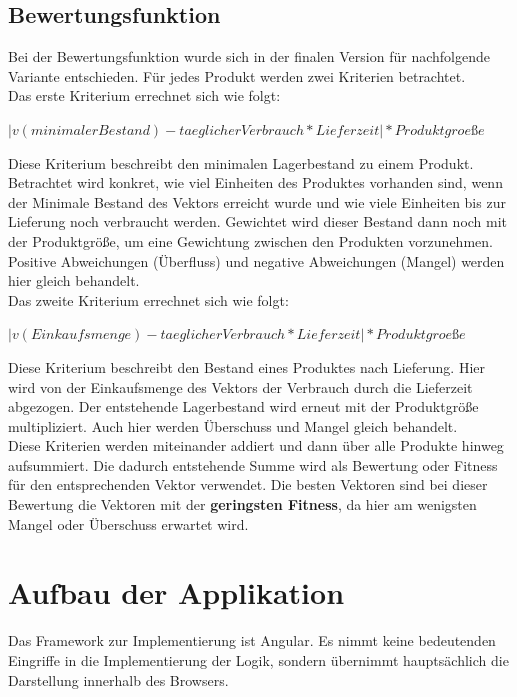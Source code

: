 \documentclass[]{scrartcl}
\begin{document}
\subsection{Bewertungsfunktion}
\label{bewertung}
Bei der Bewertungsfunktion wurde sich in der finalen Version für nachfolgende Variante entschieden. Für jedes Produkt werden zwei Kriterien betrachtet.\\

Das erste Kriterium errechnet sich wie folgt:

\begin{center}
	\(|v(minimaler Bestand) - taeglicher Verbrauch * Lieferzeit | * Produktgroeße\)
\end{center}

Diese Kriterium beschreibt den minimalen Lagerbestand zu einem Produkt. Betrachtet wird konkret, wie viel Einheiten des Produktes vorhanden sind, wenn der Minimale Bestand des Vektors erreicht wurde und wie viele Einheiten bis zur Lieferung noch verbraucht werden. Gewichtet wird dieser Bestand dann noch mit der Produktgröße, um eine Gewichtung zwischen den Produkten vorzunehmen. Positive Abweichungen (Überfluss) und negative Abweichungen (Mangel) werden hier gleich behandelt.\\

Das zweite Kriterium errechnet sich wie folgt:

\begin{center}
	\(|v(Einkaufsmenge) - taeglicher Verbrauch * Lieferzeit | * Produktgroeße\)
\end{center}

Diese Kriterium beschreibt den Bestand eines Produktes nach Lieferung. Hier wird von der Einkaufsmenge des Vektors der Verbrauch durch die Lieferzeit abgezogen. Der entstehende Lagerbestand wird erneut mit der Produktgröße multipliziert. Auch hier werden Überschuss und Mangel gleich behandelt.\\

Diese Kriterien werden miteinander addiert und dann über alle Produkte hinweg aufsummiert. Die dadurch entstehende Summe wird als Bewertung oder Fitness für den entsprechenden Vektor verwendet. Die besten Vektoren sind bei dieser Bewertung die Vektoren mit der \textbf{geringsten Fitness}, da hier am wenigsten Mangel oder Überschuss erwartet wird.

\newpage
\section{Aufbau der Applikation}
\label{aufbau}
Das Framework zur Implementierung ist Angular. Es nimmt keine bedeutenden Eingriffe in die Implementierung der Logik, sondern übernimmt hauptsächlich die Darstellung innerhalb des Browsers.
\end{document}
